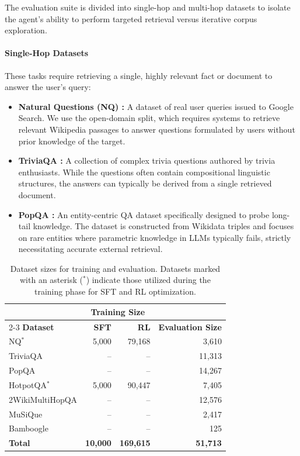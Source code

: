 \documentclass{llmxive}
\begin{document}
The evaluation suite is divided into single-hop and multi-hop datasets to isolate the agent's ability to perform targeted retrieval versus iterative corpus exploration.

\paragraph{Single-Hop Datasets} These tasks require retrieving a single, highly relevant fact or document to answer the user's query:
\begin{itemize}[leftmargin=1.2em]
    \item \textbf{Natural Questions (NQ) \citep{nq}:} A dataset of real user queries issued to Google Search. We use the open-domain split, which requires systems to retrieve relevant Wikipedia passages to answer questions formulated by users without prior knowledge of the target.
    \item \textbf{TriviaQA \citep{triviaqa}:} A collection of complex trivia questions authored by trivia enthusiasts. While the questions often contain compositional linguistic structures, the answers can typically be derived from a single retrieved document. 
    \item \textbf{PopQA \citep{popqa}:} An entity-centric QA dataset specifically designed to probe long-tail knowledge. The dataset is constructed from Wikidata triples and focuses on rare entities where parametric knowledge in LLMs typically fails, strictly necessitating accurate external retrieval.
\end{itemize}

\begin{table}[!b]
\centering
\begin{tabular}{lrrr}
\toprule
 & \multicolumn{2}{c}{\textbf{Training Size}} & \\
\cmidrule(lr){2-3}
\textbf{Dataset} & \textbf{SFT} & \textbf{RL} & \textbf{Evaluation Size} \\
\midrule
NQ$^*$ & 5,000 & 79,168 & 3,610 \\
TriviaQA & -- & -- & 11,313 \\
PopQA & -- & -- & 14,267 \\
HotpotQA$^*$ & 5,000 & 90,447 & 7,405 \\
2WikiMultiHopQA & -- & -- & 12,576 \\
MuSiQue & -- & -- & 2,417 \\
Bamboogle & -- & -- & 125 \\
\midrule
\textbf{Total} & \textbf{10,000} & \textbf{169,615} & \textbf{51,713} \\
\bottomrule
\end{tabular}
\caption{Dataset sizes for training and evaluation. Datasets marked with an asterisk ($^*$) indicate those utilized during the training phase for SFT and RL optimization.}
\label{tab:dataset}
\end{table}
\end{document}
